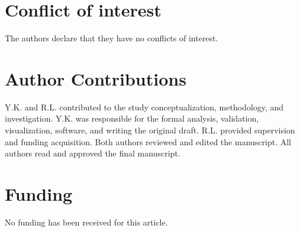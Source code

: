 \documentclass[a4paper,9pt,parskip=half,english]{article}
\theoremstyle{plain}
\theoremstyle{definition}
\begin{document}
\section*{Conflict of interest}
The authors declare that they have no conflicts of interest.

\section*{Author Contributions}
Y.K. and R.L. contributed to the study conceptualization, methodology, and investigation. Y.K. was responsible for the formal analysis, validation, visualization, software, and writing the original draft. R.L. provided supervision and funding acquisition. Both authors reviewed and edited the manuscript. All authors read and approved the final manuscript.

\section*{Funding}
No funding has been received for this article.





\end{document}
